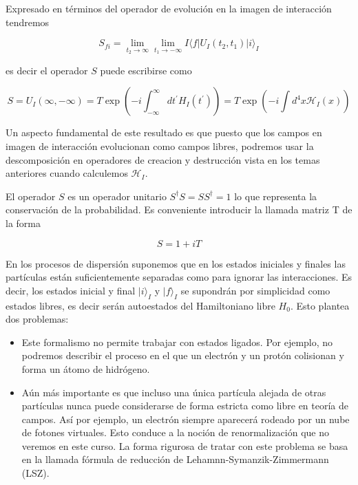 Expresado en términos del operador de evolución en la imagen de interacción tendremos

\begin{equation*}
S_{f i}=\lim _{t_{2} \rightarrow \infty} \lim _{t_{1} \rightarrow-\infty} I\langle f| U_{I}\left(t_{2}, t_{1}\right)|i\rangle_{I} \tag{7.14}
\end{equation*}

es decir el operador $S$ puede escribirse como

\begin{equation*}
S=U_{I}(\infty,-\infty)=T \exp \left(-i \int_{-\infty}^{\infty} d t^{\prime} H_{I}\left(t^{\prime}\right)\right)=T \exp \left(-i \int d^{4} x \mathscr{H}_{I}(x)\right) \tag{7.15}
\end{equation*}


Un aspecto fundamental de este resultado es que puesto que los campos en imagen de interacción evolucionan como campos libres, podremos usar la descomposición en operadores de creacion y destrucción vista en los temas anteriores cuando calculemos $\mathscr{H}_{I}$.

El operador $S$ es un operador unitario $S^{\dagger} S=S S^{\dagger}=1$ lo que representa la conservación de la probabilidad. Es conveniente introducir la llamada matriz T de la forma

\begin{equation*}
S=1+i T \tag{7.16}
\end{equation*}


En los procesos de dispersión suponemos que en los estados iniciales y finales las partículas están suficientemente separadas como para ignorar las interacciones. Es decir, los estados inicial y final $|i\rangle_{I}$ y $|f\rangle_{I}$ se supondrán por simplicidad como estados libres, es decir serán autoestados del Hamiltoniano libre $H_{0}$. Esto plantea dos problemas:
\begin{itemize}
  \item Este formalismo no permite trabajar con estados ligados. Por ejemplo, no podremos describir el proceso en el que un electrón y un protón colisionan y forma un átomo de hidrógeno.
  \item Aún más importante es que incluso una única partícula alejada de otras partículas nunca puede considerarse de forma estricta como libre en teoría de campos. Así por ejemplo, un electrón siempre aparecerá rodeado por un nube de fotones virtuales. Esto conduce a la noción de renormalización que no veremos en este curso. La forma rigurosa de tratar con este problema se basa en la llamada fórmula de reducción de Lehamnn-Symanzik-Zimmermann (LSZ).
\end{itemize}


